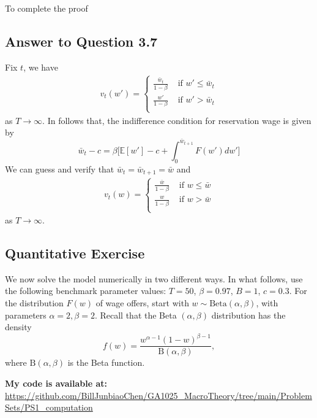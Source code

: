 \documentclass[11pt]{article}
\theoremstyle{definition}
\theoremstyle{boldtitle} %
\numberwithin{equation}{section}
\numberwithin{figure}{section}
\numberwithin{table}{section}
\begin{document}
To complete the proof


\subsection*{Answer to Question 3.7}
Fix $t$, we have
\begin{align*}
v_{t}(w') =
\begin{cases} 
  \frac{\bar{w}_t}{1 - \beta} & \text{ if } w' \leq \bar{w}_t \\[10pt]
  \frac{w'}{1 - \beta} & \text{ if } w' > \bar{w}_t \\[10pt]
\end{cases}
\end{align*}
as $T \rightarrow \infty$.
In follows that, the indifference condition for reservation wage is given by
\[
\bar{w}_t - c = \beta \bigg[ \mathbb{E}[w'] - c + \int_0^{\bar{w}_{t+1}} F(w') dw'\bigg]
\]
We can guess and verify that $\bar{w}_t = \bar{w}_{t+1} = \bar{w}$ and 
\begin{align*}
v_{t}(w) =
\begin{cases} 
  \frac{\bar{w}}{1 - \beta} & \text{ if } w \leq \bar{w} \\[10pt]
  \frac{w}{1 - \beta} & \text{ if } w > \bar{w} \\[10pt]
\end{cases}
\end{align*}
as $T\rightarrow \infty$.



\subsection*{Quantitative Exercise}

We now solve the model numerically in two different ways. 
In what follows, use the 
following benchmark parameter values: \( T = 50 \), \( \beta = 0.97 \), \( B = 1 \), \( c = 0.3 \). 
For the distribution \( F(w) \) of wage offers, start with \( w \sim \text{Beta}(\alpha, \beta) \), 
with parameters \( \alpha = 2, \beta = 2 \). 
Recall that the Beta \((\alpha, \beta)\) distribution 
has the density
\[
f(w) = \frac{w^{\alpha - 1} (1 - w)^{\beta - 1}}{\text{B}(\alpha, \beta)},
\]
where \(\text{B}(\alpha, \beta)\) is the Beta function.


\textbf{My code is available at:} \\
\url{https://github.com/BillJunbiaoChen/GA1025_MacroTheory/tree/main/ProblemSets/PS1_computation}
\end{document}
